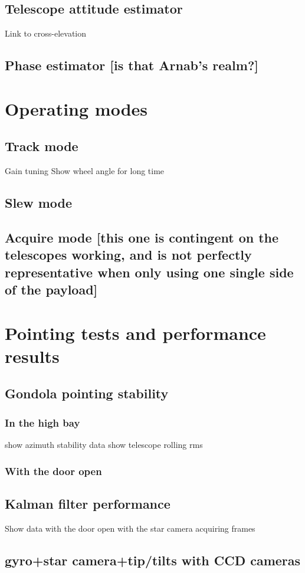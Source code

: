 \subsection{Telescope attitude estimator}
Link to cross-elevation
\subsection{Phase estimator [is that Arnab’s realm?]}

\section{Operating modes}
\subsection{Track mode}
Gain tuning
Show wheel angle for long time
\subsection{Slew mode}
\subsection{Acquire mode [this one is contingent on the telescopes working, and is not perfectly representative when only using one single side of the payload]}

\section{Pointing tests and performance results}
\subsection{Gondola pointing stability}
\subsubsection{In the high bay}
 show azimuth stability data
show telescope rolling rms
\subsubsection{With the door open}
\subsection{Kalman filter performance}
Show data with the door open with the star camera acquiring frames
\subsection{gyro+star camera+tip/tilts with CCD cameras}
